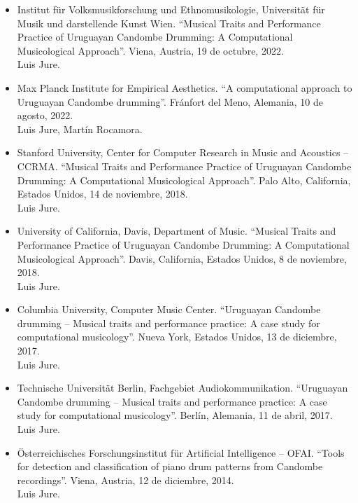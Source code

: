 

\begin{itemize}

\item[ ]	%
Institut für Volksmusikforschung und Ethnomusikologie, Universität für Musik und darstellende Kunst Wien.
``Musical Traits and Performance Practice of Uruguayan Candombe Drumming:
A Computational Musicological Approach''.
Viena, Austria, 19 de octubre, 2022.\\
Luis Jure.

\item[ ]	%
Max Planck Institute for Empirical Aesthetics.
``A computational approach to Uruguayan Candombe drumming''.
Fránfort del Meno, Alemania, 10 de agosto, 2022.\\
Luis Jure, Martín Rocamora.

\item[ ]	%
Stanford University, Center for Computer Research in Music and Acoustics -- CCRMA.
``Musical Traits and Performance Practice of Uruguayan Candombe Drumming:
A Computational Musicological Approach''.
Palo Alto, California, Estados Unidos, 14 de noviembre, 2018.\\
Luis Jure.

\item[ ]	%
University of California, Davis, Department of Music.
``Musical Traits and Performance Practice of Uruguayan Candombe Drumming:
A Computational Musicological Approach''.
Davis, California, Estados Unidos, 8 de noviembre, 2018.\\
Luis Jure.

\item[ ]	%
Columbia University, Computer Music Center.
``Uruguayan Candombe drumming -- Musical traits and performance practice:
A case study for computational musicology''.
Nueva York, Estados Unidos, 13 de diciembre, 2017.\\
Luis Jure.

\item[ ]	%
Technische Universität Berlin, Fachgebiet Audiokommunikation.
``Uruguayan Candombe drumming -- Musical traits and performance practice:
A case study for computational musicology''.
Berlín, Alemania, 11 de abril, 2017.\\
Luis Jure.

\item[ ]	%
Österreichisches Forschungsinstitut für Artificial Intelligence -- OFAI.
``Tools for detection and classification of piano drum patterns from Candombe recordings''.
Viena, Austria, 12 de diciembre, 2014.\\
Luis Jure.


\end{itemize}
